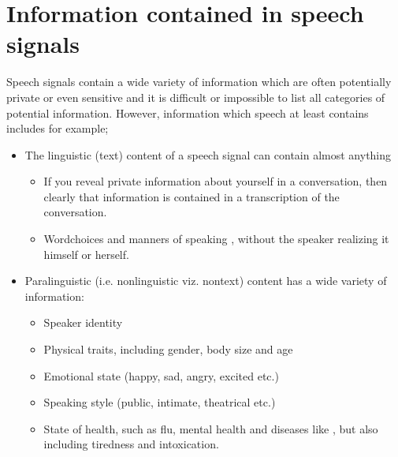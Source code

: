 \documentclass[letterpaper,10pt,english]{jupyterBook}
\begin{document}
\section{Information contained in speech signals}
\label{\detokenize{Security_and_privacy:information-contained-in-speech-signals}}
\sphinxAtStartPar
Speech signals contain a wide variety of information which are often
potentially private or even sensitive and it is difficult or impossible
to list all categories of potential information. However, information
which speech at least contains includes for example;
\begin{itemize}
\item {} 
\sphinxAtStartPar
The linguistic (text) content of a speech signal can contain almost
anything
\begin{itemize}
\item {} 
\sphinxAtStartPar
If you reveal private information about yourself in a
conversation, then clearly that information is contained in a
transcription of the conversation.

\item {} 
\sphinxAtStartPar
Word\sphinxhyphen{}choices and manners of speaking , without the speaker realizing it himself or herself.

\end{itemize}

\item {} 
\sphinxAtStartPar
Para\sphinxhyphen{}linguistic (i.e. non\sphinxhyphen{}linguistic viz. non\sphinxhyphen{}text) content has a
wide variety of information:
\begin{itemize}
\item {} 
\sphinxAtStartPar
Speaker identity

\item {} 
\sphinxAtStartPar
Physical traits, including gender, body size and age

\item {} 
\sphinxAtStartPar
Emotional state (happy, sad, angry, excited etc.)

\item {} 
\sphinxAtStartPar
Speaking style (public, intimate, theatrical etc.)

\item {} 
\sphinxAtStartPar
State of health, such as flu, mental health and diseases like
,
but also including tiredness and intoxication.


\end{itemize}
\end{itemize}
\end{document}
